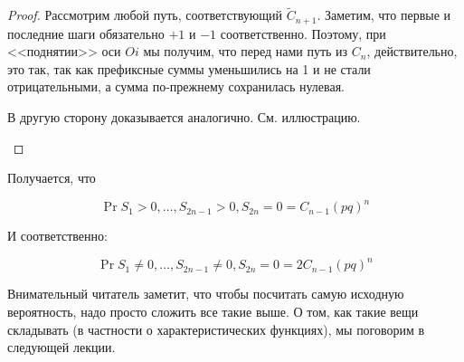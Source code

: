 \begin{proof}
  Рассмотрим любой путь, соответствующий $\tilde{C}_{n + 1}$. Заметим, что
  первые и последние шаги обязательно $+1$ и $-1$ соответственно. Поэтому, 
  при <<поднятии>> оси $Oi$ мы получим, что перед нами путь из $C_n$, 
  действительно, это так, так как префиксные суммы уменьшились на 1 и не стали 
  отрицательными, а сумма по-прежнему сохранилась нулевая.

  В другую сторону доказывается аналогично. См. иллюстрацию.

  \begin{center}
\end{center}
\end{proof}

Получается, что

\[
  \Pr{S_1 > 0, \ldots, S_{2n - 1} > 0, S_{2n} = 0} = C_{n - 1}(pq)^n
\]

И соответственно:

\[
  \Pr{S_1 \neq 0, \ldots, S_{2n - 1} \neq 0, S_{2n} = 0} = 2C_{n - 1}(pq)^n
\]

Внимательный читатель заметит, что чтобы посчитать самую исходную 
вероятность, надо просто сложить все такие выше. О том, как такие вещи 
складывать (в частности о характеристических функциях), мы поговорим в
следующей лекции.


